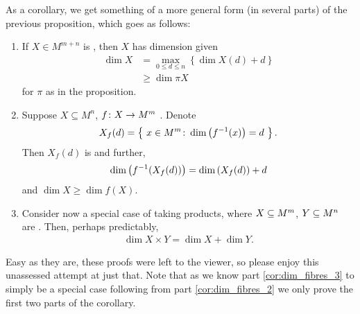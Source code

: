 As a corollary, we get something of a more general form (in several parts) of the previous proposition, which goes as follows:
\begin{corollary}
  \label{cor:dim_fibres}
  \leavevmode
  \begin{enumerate}
    \item \label{cor:dim_fibres_1} If $X \in M^{m + n}$ is , then $X$ has dimension given
      \begin{align*}
        \dim{X} &= \max_{0 \leq d \leq n}{ \left\{ \dim{X(d)} + d \right\} } \\
        &\geq \dim{\pi X}
      \end{align*}
      for $\pi$ as in the proposition.

    \item \label{cor:dim_fibres_2} Suppose $X \subseteq M^n$, $\funcdom{f}{X}{M^m}$ . Denote
      \begin{align*}
        X_f(d) = \left\{ \ x \in M^m \colon \dim{\inv{f}(x)} = d \ \right\}.
      \end{align*}
      Then $X_f(d)$ is  and further,
      \begin{align*}
        \dim{\inv{f}(X_f(d))} = \dim{X_f(d)} + d
      \end{align*}
      and $\dim{X} \geq \dim{f(X)}$.

    \item \label{cor:dim_fibres_3} Consider now a special case of taking products, where $\XMn[X]{m}$, $\XMn[Y]{n}$ are . Then, perhaps predictably,
      \begin{align*}
       \dim{X \times Y} = \dim{X} + \dim{Y}.
      \end{align*}
    \end{enumerate}
\end{corollary}

Easy as they are, these proofs were left to the viewer, so please enjoy this unassessed attempt at just that. Note that as we know part \ref{cor:dim_fibres_3} to simply be a special case following from part \ref{cor:dim_fibres_2} we only prove the first two parts of the corollary.

